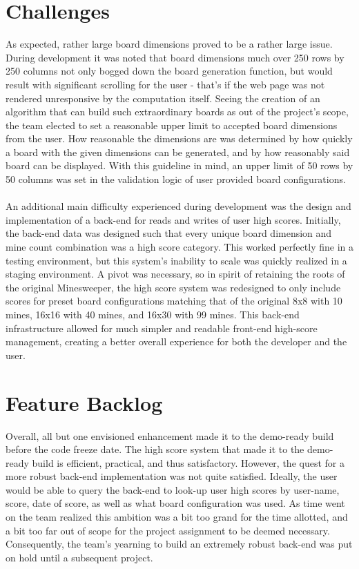 \documentclass[12pt]{report}
\begin{document}
\section*{Challenges}
As expected, rather large board dimensions proved to be a rather large issue. During development it was noted that board dimensions much over 250 rows by 250 columns not only bogged down the board generation function, but would result with significant scrolling for the user - that's if the web page was not rendered unresponsive by the computation itself. Seeing the creation of an algorithm that can build such extraordinary boards as out of the project's scope, the team elected to set a reasonable upper limit to accepted board dimensions from the user. How reasonable the dimensions are was determined by how quickly a board with the given dimensions can be generated, and by how reasonably said board can be displayed. With this guideline in mind, an upper limit of 50 rows by 50 columns was set in the validation logic of user provided board configurations.
\\\\
An additional main difficulty experienced during development was the design and implementation of a back-end for reads and writes of user high scores. Initially, the back-end data was designed such that every unique board dimension and mine count combination was a high score category. This worked perfectly fine in a testing environment, but this system's inability to scale was quickly realized in a staging environment. A pivot was necessary, so in spirit of retaining the roots of the original Minesweeper, the high score system was redesigned to only include scores for preset board configurations matching that of the original 8x8 with 10 mines, 16x16 with 40 mines, and 16x30 with 99 mines. This back-end infrastructure allowed for much simpler and readable front-end high-score management, creating a better overall experience for both the developer and the user.  

\section*{Feature Backlog}
Overall, all but one envisioned enhancement made it to the demo-ready build before the code freeze date. The high score system that made it to the demo-ready build is efficient, practical, and thus satisfactory. However, the quest for a more robust back-end implementation was not quite satisfied. Ideally, the user would be able to query the back-end to look-up user high scores by user-name, score, date of score, as well as what board configuration was used. As time went on the team realized this ambition was a bit too grand for the time allotted, and a bit too far out of scope for the project assignment to be deemed necessary. Consequently, the team's yearning to build an extremely robust back-end was put on hold until a subsequent project.
\end{document}
